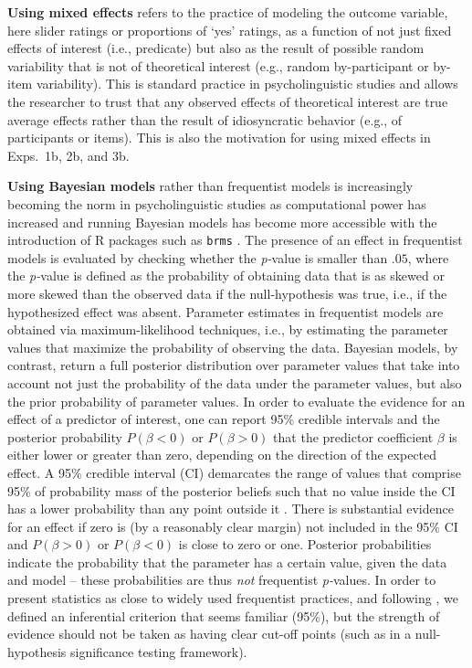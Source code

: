 \documentclass[11pt,fleqn]{article}
\newcommand{\6}{\mbox{$[\hspace*{-.6mm}[$}}
\newcommand{\9}{\mbox{$]\hspace*{-.6mm}]$}}
\begin{document}
\textbf{Using mixed effects} refers to the practice of modeling the outcome variable, here slider ratings or proportions of `yes' ratings, as a function of not just fixed effects of interest (i.e., predicate) but also as the result of possible random variability that is not of theoretical interest (e.g., random by-participant or by-item variability). This is standard practice in psycholinguistic studies and allows the researcher to trust that any observed effects of theoretical interest are true average effects rather than the result of idiosyncratic behavior (e.g., of participants or items). This is also the motivation for using mixed effects in Exps.~1b, 2b, and 3b.

\textbf{Using Bayesian models} rather than frequentist models is increasingly becoming the norm in psycholinguistic studies as computational power has increased and running Bayesian models has become more accessible with the introduction of R packages such as \verb|brms| \cite{buerkner2017}. The presence of an effect in frequentist models is evaluated by checking whether the {\em p-}value is smaller than $.05$, where the {\em p-}value is defined as the probability of obtaining data that is as skewed or more skewed than the observed data if the null-hypothesis was true, i.e., if the hypothesized effect was absent. Parameter estimates in frequentist models are obtained via maximum-likelihood techniques, i.e., by estimating the parameter values that maximize the probability of observing the data. Bayesian models, by contrast, return a full posterior distribution over parameter values that take into account not just the probability of the data under the parameter values, but also the prior probability of parameter values. In order to evaluate the evidence for an effect of a predictor of interest, one can report 95\% credible intervals and the posterior probability $P(\beta < 0)$ or $P(\beta > 0)$ that the predictor coefficient $\beta$ is either lower or greater than zero, depending on the direction of the expected effect. A 95\% credible interval (CI) demarcates the range of values that comprise 95\% of probability mass of the posterior beliefs such that no value inside the CI has a lower probability than any point outside it \cite{Jaynes1976, Morey2016}. There is substantial evidence for an effect if zero is (by a reasonably clear margin) not included in the 95\% CI and $P(\beta > 0)$ or $P(\beta < 0)$ is close to zero or one. Posterior probabilities indicate the probability that the parameter has a certain value, given the data and model -- these probabilities are thus \emph{not} frequentist {\em p-}values. In order to present statistics as close to widely used frequentist practices, and following , we defined an inferential criterion that seems familiar (95\%), but the strength of evidence should not be taken as having clear cut-off points (such as in a null-hypothesis significance testing framework).
\end{document}
